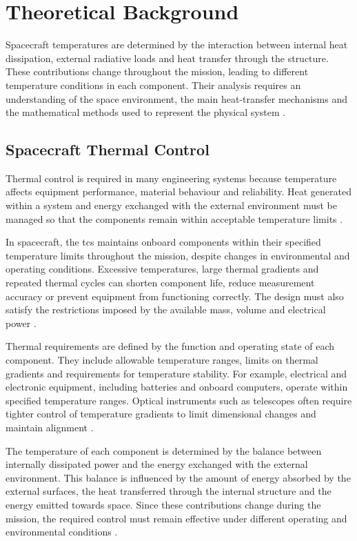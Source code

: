 \chapter{Theoretical Background}
\label{ch:theoretical_background}

Spacecraft temperatures are determined by the interaction between internal heat 
dissipation, external radiative loads and heat transfer through the structure. These 
contributions change throughout the mission, leading to different temperature 
conditions in each component. Their analysis requires an understanding of the space 
environment, the main heat-transfer mechanisms and the mathematical methods used to 
represent the physical system \cite{spacethctrl,th_handbook,thermal_eng_man}.

\section{Spacecraft Thermal Control}

Thermal control is required in many engineering systems because temperature affects 
equipment performance, material behaviour and reliability. Heat generated within a 
system and energy exchanged with the external environment must be managed so that the components 
remain within acceptable temperature limits \cite{hmt_f&a}.

In spacecraft, the \acrfull{tcs} maintains onboard components within their specified 
temperature limits throughout the mission, despite changes in environmental and operating 
conditions. Excessive temperatures, large thermal gradients and repeated thermal cycles 
can shorten component life, reduce measurement accuracy or prevent equipment from 
functioning correctly. The design must also satisfy the restrictions imposed by the 
available mass, volume and electrical power \cite{tcs_slides0,spacethctrl,th_handbook}.

Thermal requirements are defined by the function and operating state of each component. They 
include allowable temperature ranges, limits on thermal gradients 
and requirements for temperature stability. For example, electrical and electronic 
equipment, including batteries and onboard computers, operate within specified temperature 
ranges. Optical instruments such as telescopes often require tighter control of temperature 
gradients to limit dimensional changes and maintain alignment 
\cite{tcs_slides0,spacethctrl}.

The temperature of each component is determined by the balance between internally dissipated 
power and the energy exchanged with the external environment. This balance is influenced 
by the amount of energy absorbed by the external surfaces, the heat transferred through 
the internal structure and the energy emitted towards space. Since these contributions 
change during the mission, the required control must remain effective under different 
operating and environmental conditions \cite{spacethctrl,th_handbook}.


